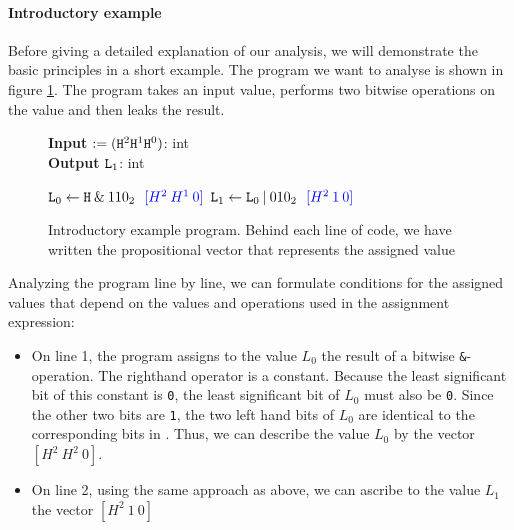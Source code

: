 \paragraph{Introductory example}\label{p:intro}
Before giving a detailed explanation of our analysis, we will demonstrate the basic principles in a short example. The program we want to analyse is shown in figure \ref{fig:introEx}. The program takes an input value, performs two bitwise operations on the value and then leaks the result. 

\begin{figure}
    \centering
    \begin{minipage}{.7\linewidth}
        \begin{algorithm}[H]
            \hspace*{\algorithmicindent} \textbf{Input} \In $:= (\mathtt{H}^2 \mathtt{H}^1 \mathtt{H}^0)$: int \\
            \hspace*{\algorithmicindent} \textbf{Output} $\mathtt{L}_1$: int
            \hspace*{1em}
            \begin{algorithmic}[1]
                \State $\mathtt{L}_0 \leftarrow \mathtt{H} \: \& \: 110_2 \: \: \: \textcolor{blue}{[H^2 \: H^1 \:0]}$
                \State $\mathtt{L}_1 \leftarrow \mathtt{L}_0 \: | \: 010_2 \: \: \: \textcolor{blue}{[H^2 \: 1 \: 0]}$
            \end{algorithmic} 
        \end{algorithm}
\end{minipage}
\caption{Introductory example program. Behind each line of code, we have written the propositional vector that represents the assigned value}
\label{fig:introEx}
\end{figure}

Analyzing the program line by line, we can formulate conditions for the assigned values that depend on the values and operations used in the assignment expression:
\begin{itemize}
    \item On line 1, the program assigns to the value $L_0$ the result of a bitwise \texttt{\&}-operation. The righthand operator is a constant. Because the least significant bit of this constant is \texttt{0}, the least significant bit of $L_0$ must also be \texttt{0}. Since the other two bits are \texttt{1}, the two left hand bits of $L_0$ are identical to the corresponding bits in \In. Thus, we can describe the value $L_0$ by the vector $[H^2 \: H^2 \: 0]$.
    \item On line 2, using the same approach as above, we can ascribe to the value $L_1$ the vector $[H^2 \: 1 \: 0]$
\end{itemize}

